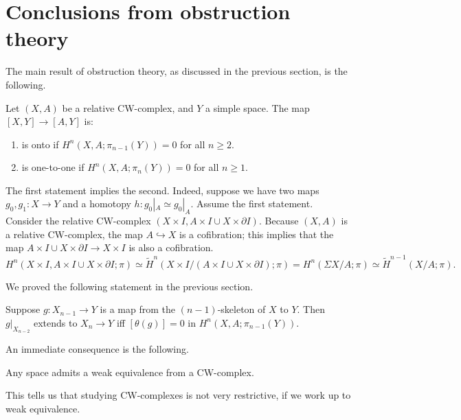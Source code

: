 \section{Conclusions from obstruction theory}
The main result of obstruction theory, as discussed in the previous section, is
the following.
\begin{theorem}
    Let $(X,A)$ be a relative CW-complex, and $Y$ a simple space. The map
    $[X,Y]\to [A,Y]$ is:
    \begin{enumerate}
	\item is onto if $H^n(X,A;\pi_{n-1}(Y)) = 0$ for all $n\geq 2$.
	\item is one-to-one if $H^n(X,A;\pi_n(Y)) = 0$ for all $n\geq 1$.
    \end{enumerate}
\end{theorem}
\begin{remark}
    The first statement implies the second. Indeed, suppose we have two maps
    $g_0,g_1:X\to Y$ and a homotopy $h:g_0|_{A}\simeq g_0|_{A}$. Assume the
    first statement. Consider the relative CW-complex $(X\times I,A\times I\cup
    X\times\partial I)$. Because $(X,A)$ is a relative CW-complex, the map
    $A\hookrightarrow X$ is a cofibration; this implies that the map $A\times
    I\cup X\times\partial I\to X\times I$ is also a cofibration.
    $$H^n(X\times I,A\times I\cup X\times\partial I;\pi)\simeq
    \widetilde{H}^n(X\times I/(A\times I\cup X\times\partial I);\pi) =
    H^n(\Sigma X/A;\pi)\simeq \widetilde{H}^{n-1}(X/A;\pi).$$
\end{remark}
We proved the following statement in the previous section.
\begin{prop}
    Suppose $g:X_{n-1}\to Y$ is a map from the $(n-1)$-skeleton of $X$ to $Y$.
    Then $g|_{X_{n-2}}$ extends to $X_n\to Y$ iff $[\theta(g)] = 0$ in
    $H^n(X,A;\pi_{n-1}(Y))$.
\end{prop}
An immediate consequence is the following.
\begin{theorem}[CW-approximation]
    Any space admits a weak equivalence from a CW-complex.
\end{theorem}
This tells us that studying CW-complexes is not very restrictive, if we work up
to weak equivalence.

